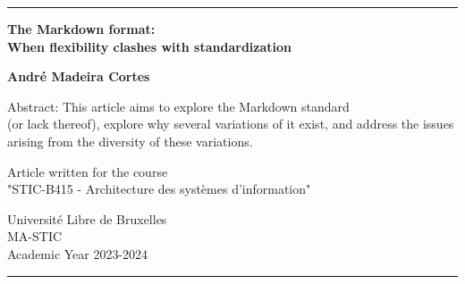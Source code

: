 \begin{titlepage}
	\center

	\rule{\linewidth}{1pt} %

	\vspace{2cm}

	\Large \textbf{
		The Markdown format: \\ \vspace{0.2cm} When flexibility clashes with standardization
	}

	\vspace{2cm}

	\large \textbf{ André Madeira Cortes }

	\vspace{5cm}

	Abstract: This article aims to explore the Markdown standard \\ (or lack thereof), explore why several variations of it exist, and address the issues arising from the diversity of these variations.

	\vspace{5cm}

	Article written for the course \\ "STIC-B415 - Architecture des systèmes d'information" \\

	\vspace{0.8cm}

	Université Libre de Bruxelles\\
	MA-STIC \\
	Academic Year 2023-2024

	\rule{\linewidth}{1pt} %
\end{titlepage}
